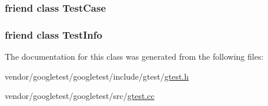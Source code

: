 \subsubsection[{\texorpdfstring{Test\+Case}{TestCase}}]{\setlength{\rightskip}{0pt plus 5cm}friend class {\bf Test\+Case}\hspace{0.3cm}{\ttfamily [friend]}}\hypertarget{classtesting_1_1TestEventListeners_aff779e55b06adfa7c0088bd10253f0f0}{}\label{classtesting_1_1TestEventListeners_aff779e55b06adfa7c0088bd10253f0f0}
\subsubsection[{\texorpdfstring{Test\+Info}{TestInfo}}]{\setlength{\rightskip}{0pt plus 5cm}friend class {\bf Test\+Info}\hspace{0.3cm}{\ttfamily [friend]}}\hypertarget{classtesting_1_1TestEventListeners_a4c49c2cdb6c328e6b709b4542f23de3c}{}\label{classtesting_1_1TestEventListeners_a4c49c2cdb6c328e6b709b4542f23de3c}


The documentation for this class was generated from the following files\+:\begin{DoxyCompactItemize}
\item 
vendor/googletest/googletest/include/gtest/\hyperlink{gtest_8h}{gtest.\+h}\item 
vendor/googletest/googletest/src/\hyperlink{gtest_8cc}{gtest.\+cc}\end{DoxyCompactItemize}
